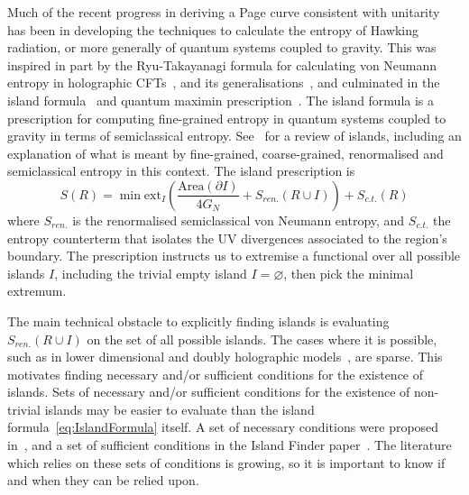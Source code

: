 \documentclass[a4paper,11pt]{article}
\newcommand{\cts}[1]{\ignorespaces}
\def\bne{\begin{equation}}
\def\ene{\end{equation}}
\newcommand{\del}{\partial}
\begin{document}
Much of the recent progress in deriving a Page curve consistent with unitarity has been in developing the techniques to calculate the entropy of Hawking radiation, or more generally of quantum systems coupled to gravity. This was inspired in part by the Ryu-Takayanagi formula for calculating von Neumann entropy in holographic CFTs~\cite{Ryu_2006,Freedman2017}, and its generalisations~\cite{Hubeny2007,Engelhardt2014,Harper2018,Rolph2021}, and culminated in the island formula~\cite{Almheiri2019b} and quantum maximin prescription~\cite{Akers2019}. The island formula is a prescription for computing fine-grained entropy in quantum systems coupled to gravity in terms of semiclassical entropy. See~\cite{Almheiri2021} for a review of islands, including an explanation of what is meant by fine-grained, coarse-grained, renormalised and semiclassical entropy in this context. The island prescription is
\bne \label{eq:IslandFormula} S(R) = \min \text{ext}_I
 \left ( \frac{\text{Area}(\del I)}{4G_N} + S_{ren.}(R \cup I) \right ) + S_{c.t.} (R) \ene
where $S_{ren.}$ is the renormalised semiclassical von Neumann entropy, and $S_{c.t.}$ the entropy counterterm that isolates the UV divergences associated to the region's boundary. 
The prescription instructs us to extremise a functional over all possible islands $I$, including the trivial empty island $I = \varnothing$, then pick the minimal extremum.

The main technical obstacle to explicitly finding islands is evaluating $S_{ren.} (R\cup I)$ on the set of all possible islands. The cases where it is possible, such as in lower dimensional and doubly holographic models~\cite{Almheiri2019b,Almheiri2019,Almheiri2019a,Almheiri2020}, are sparse. This motivates finding necessary and/or sufficient conditions for the existence of islands. Sets of necessary and/or sufficient conditions for the existence of non-trivial islands may be easier to evaluate than the island formula~\eqref{eq:IslandFormula} itself. A set of necessary conditions were proposed in~\cite{Hartman2020}, and a set of sufficient conditions in the Island Finder paper~\cite{Bousso2021}. The literature which relies on these sets of conditions is growing, so it is important to know if and when they can be relied upon.
\end{document}
